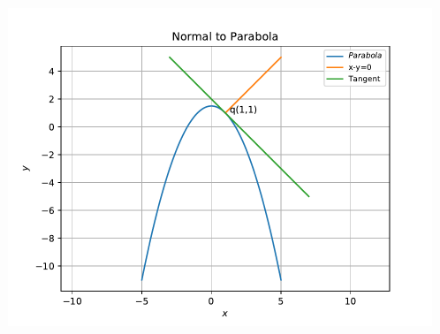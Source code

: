 \documentclass[12pt]{article}
\begin{document}
\begin{enumerate}
\begin{figure}[!h]
\begin{center}
		\includegraphics[width=\columnwidth]{figs/problem22.pdf}
	\end{center}
\caption{}
\label{fig:Fig1}
\end{figure}
\end{enumerate}
\end{document}

